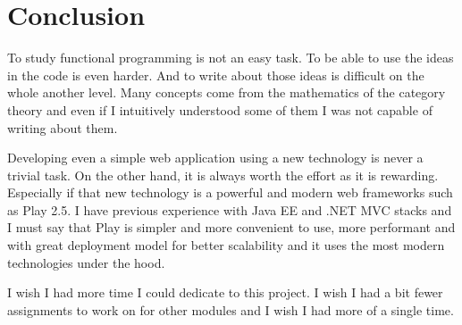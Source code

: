\documentclass[12pt,twoside,a4paper]{report}
\begin{document}
\section{Conclusion}\label{7.3}
To study functional programming is not an easy task. To be able to use the ideas in the code is even harder. And to write about those ideas is difficult on the whole another level. Many concepts come from the mathematics of the category theory and even if I intuitively understood some of them I was not capable of writing about them.

Developing even a simple web application using a new technology is never a trivial task. On the other hand, it is always worth the effort as it is rewarding. Especially if that new technology is a powerful and modern web frameworks such as Play 2.5. I have previous experience with Java EE and .NET MVC stacks and I must say that Play is simpler and more convenient to use, more performant and with great deployment model for better scalability and it uses the most modern technologies under the hood.

I wish I had more time I could dedicate to this project. I wish I had a bit fewer assignments to work on for other modules and I wish I had more of a single time.
\end{document}
